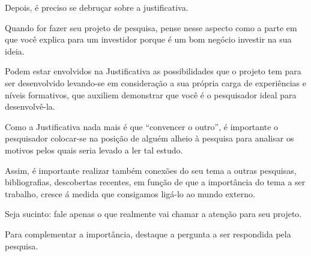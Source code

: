 Depois, é preciso se debruçar sobre a justificativa.

Quando for fazer seu projeto de pesquisa, pense nesse aspecto como a parte em que você explica para um investidor porque é um bom negócio investir na sua ideia.

Podem estar envolvidos na Justificativa as possibilidades que o projeto tem para ser desenvolvido levando-se em consideração a sua própria carga de experiências e níveis formativos, que auxiliem demonstrar que você é o pesquisador ideal para desenvolvê-la.

Como a Justificativa nada mais é que “convencer o outro”, é importante o pesquisador colocar-se na posição de alguém alheio à pesquisa para analisar os motivos pelos quais seria levado a ler tal estudo.

Assim, é importante realizar também conexões do seu tema a outras pesquisas, bibliografias, descobertas recentes, em função de que a importância do tema a ser trabalho, cresce á medida que consigamos ligá-lo ao mundo externo.

Seja sucinto: fale apenas o que realmente vai chamar a atenção para seu projeto.

Para complementar a importância, destaque a pergunta a ser respondida pela pesquisa.
